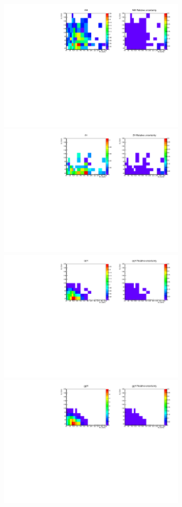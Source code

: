 \begin{figure}[htp]
\centering
\includegraphics[width=0.8\textwidth]{figures/2dtemplate_WH_mH125_0j.pdf}
\includegraphics[width=0.8\textwidth]{figures/2dtemplate_ZH_mH125_0j.pdf}
\includegraphics[width=0.8\textwidth]{figures/2dtemplate_qqH_mH125_0j.pdf}
\includegraphics[width=0.8\textwidth]{figures/2dtemplate_ggH_mH125_0j.pdf}

\end{figure}

